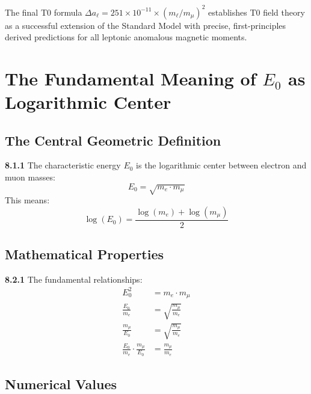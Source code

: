 \documentclass[12pt,a4paper]{article}
\newcommand{\Ezero}{E_0}
\begin{document}
	The final T0 formula $\Delta a_\ell = 251 \times 10^{-11} \times (m_\ell/m_\mu)^2$ establishes T0 field theory as a successful extension of the Standard Model with precise, first-principles derived predictions for all leptonic anomalous magnetic moments.

\section{The Fundamental Meaning of $\Ezero$ as Logarithmic Center}

\subsection{The Central Geometric Definition}

\begin{tcolorbox}[colback=yellow!10!white,colframe=red!75!black,title=Fundamental Definition]
	\noindent \textbf{8.1.1} The characteristic energy $\Ezero$ is the logarithmic center between electron and muon masses:
	\begin{equation}
		\boxed{\Ezero = \sqrt{m_e \cdot m_\mu}}
		\label{eq:E0_fundamental}
	\end{equation}
	This means:
	\begin{equation}
		\log(\Ezero) = \frac{\log(m_e) + \log(m_\mu)}{2}
		\label{eq:E0_logarithmic}
	\end{equation}
\end{tcolorbox}

\subsection{Mathematical Properties}

\noindent \textbf{8.2.1} The fundamental relationships:
\begin{align}
	\Ezero^2 &= m_e \cdot m_\mu \label{eq:E0_squared} \\
	\frac{\Ezero}{m_e} &= \sqrt{\frac{m_\mu}{m_e}} \label{eq:E0_ratio1} \\
	\frac{m_\mu}{\Ezero} &= \sqrt{\frac{m_\mu}{m_e}} \label{eq:E0_ratio2} \\
	\frac{\Ezero}{m_e} \cdot \frac{m_\mu}{\Ezero} &= \frac{m_\mu}{m_e} \label{eq:E0_product}
\end{align}

\subsection{Numerical Values}
\end{document}
